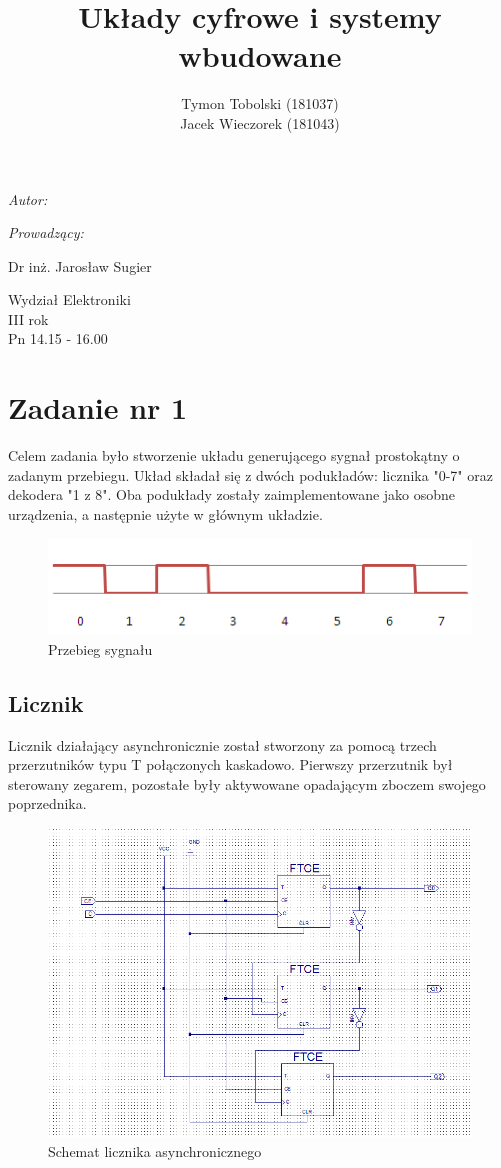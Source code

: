 \documentclass[wide,a4paper,titlepage,12pt] {article}
\title{Układy cyfrowe i systemy wbudowane}
\author{Tymon Tobolski (181037)\\ Jacek Wieczorek (181043)}
\makeatletter
\renewcommand{\maketitle}{
\begin{titlepage}
  \begin{center}
    \vspace*{3cm}
    \LARGE \@title \par
    \vspace{2cm}
    \textit{\small Autor:}\par
    \normalsize \@author\par \normalsize
    \vspace{3cm}
    \textit{\small Prowadzący:}\par
    Dr inż. Jarosław Sugier \par
    \vspace{2cm}
    Wydział Elektroniki\\ III rok\\ Pn 14.15 - 16.00\par
    \vspace{4cm}
    \small \@date
  \end{center}
\end{titlepage}
}
\makeatother
\begin{document}
\maketitle
  \section{Zadanie nr 1}
  Celem zadania było stworzenie układu generującego sygnał prostokątny o zadanym przebiegu.
  Układ składał się z dwóch podukładów: licznika "0-7" oraz dekodera "1 z 8".
  Oba podukłady zostały zaimplementowane jako osobne urządzenia, a następnie użyte w głównym układzie.

  \begin{figure}[htbp]
    \begin{center}
      \includegraphics[scale=0.6]{syg.png}
      \caption{Przebieg sygnału}
    \end{center}
  \end{figure}

  \subsection{Licznik}
  Licznik działający asynchronicznie został stworzony za pomocą trzech przerzutników typu T połączonych kaskadowo. Pierwszy przerzutnik był sterowany zegarem, pozostałe były aktywowane opadającym zboczem swojego poprzednika.

  \begin{figure}[htbp]
    \begin{center}
      \includegraphics[scale=0.6]{licznik_asynch.png}
      \caption{Schemat licznika asynchronicznego}
    \end{center}
  \end{figure}
\end{document}
